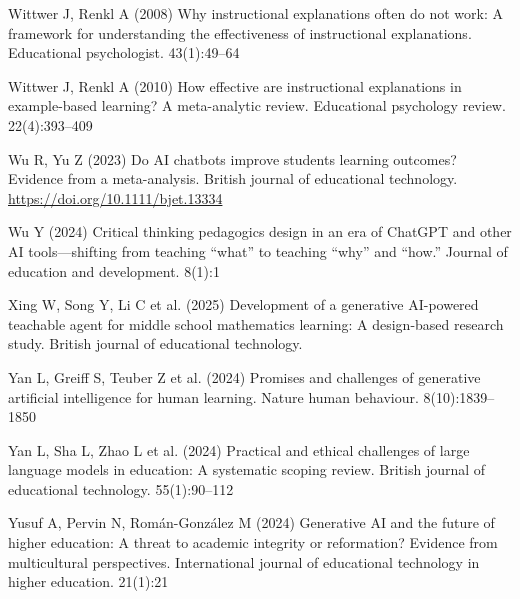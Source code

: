 \documentclass[
  12pt,
]{article}
\newlength{\cslhangindent}
\newenvironment{CSLReferences}[2] %
 {\begin{list}{}{%
  \setlength{\itemindent}{0pt}
  \setlength{\leftmargin}{0pt}
  \setlength{\parsep}{0pt}
  \ifodd #1
   \setlength{\leftmargin}{\cslhangindent}
   \setlength{\itemindent}{-1\cslhangindent}
  \fi
  \setlength{\itemsep}{#2\baselineskip}}}
 {\end{list}}
\begin{document}
\begin{CSLReferences}{1}{0}
Wittwer J, Renkl A (2008) Why instructional explanations often do not work: A framework for understanding the effectiveness of instructional explanations. Educational psychologist. 43(1):49--64

Wittwer J, Renkl A (2010) How effective are instructional explanations in example-based learning? A meta-analytic review. Educational psychology review. 22(4):393--409

Wu R, Yu Z (2023) Do AI chatbots improve students learning outcomes? Evidence from a meta-analysis. British journal of educational technology. \url{https://doi.org/10.1111/bjet.13334}

Wu Y (2024) Critical thinking pedagogics design in an era of ChatGPT and other AI tools---shifting from teaching {``what''} to teaching {``why''} and {``how.''} Journal of education and development. 8(1):1

Xing W, Song Y, Li C et al. (2025) Development of a generative AI-powered teachable agent for middle school mathematics learning: A design-based research study. British journal of educational technology.

Yan L, Greiff S, Teuber Z et al. (2024) Promises and challenges of generative artificial intelligence for human learning. Nature human behaviour. 8(10):1839--1850

Yan L, Sha L, Zhao L et al. (2024) Practical and ethical challenges of large language models in education: A systematic scoping review. British journal of educational technology. 55(1):90--112

Yusuf A, Pervin N, Román-González M (2024) Generative AI and the future of higher education: A threat to academic integrity or reformation? Evidence from multicultural perspectives. International journal of educational technology in higher education. 21(1):21

\end{CSLReferences}

\clearpage
\processdelayedfloats
\clearpage
\appendix
\setcounter{table}{0}
\setcounter{figure}{0}
\renewcommand{\thetable}{A\arabic{table}}
\renewcommand{\thefigure}{A\arabic{figure}}
\end{document}
